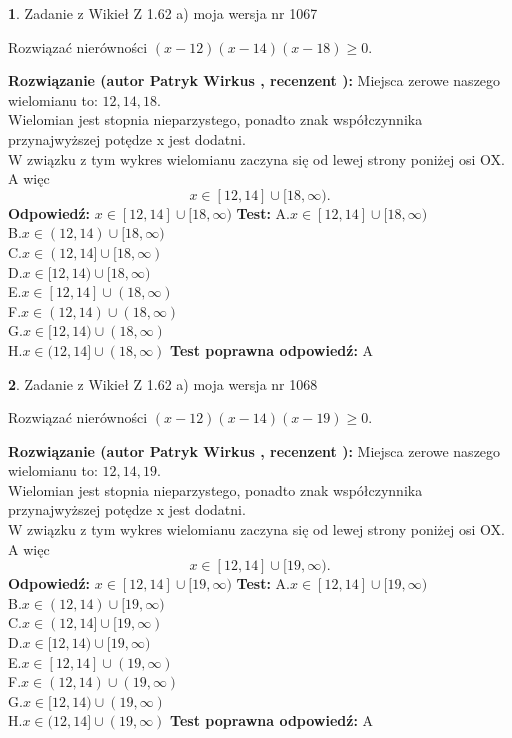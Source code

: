 \documentclass[12pt, a4paper]{article}
\theoremstyle{definition} %
\newtheorem{zad}{}
\newcommand{\zadStart}[1]{\begin{zad}#1\newline}
\newcommand{\zadStop}{\end{zad}}
\newcommand{\rozwStart}[2]{\noindent \textbf{Rozwiązanie (autor #1 , recenzent #2): }\newline}
\newcommand{\rozwStop}{\newline}
\newcommand{\odpStart}{\noindent \textbf{Odpowiedź:}\newline}
\newcommand{\odpStop}{\newline}
\newcommand{\testStart}{\noindent \textbf{Test:}\newline}
\newcommand{\testStop}{\newline}
\newcommand{\kluczStart}{\noindent \textbf{Test poprawna odpowiedź:}\newline}
\newcommand{\kluczStop}{\newline}
\begin{document}
\zadStart{Zadanie z Wikieł Z 1.62 a) moja wersja nr 1067}

Rozwiązać nierówności $(x-12)(x-14)(x-18)\ge0$.
\zadStop
\rozwStart{Patryk Wirkus}{}
Miejsca zerowe naszego wielomianu to: $12, 14, 18$.\\
Wielomian jest stopnia nieparzystego, ponadto znak współczynnika przy\linebreak najwyższej potędze x jest dodatni.\\ W związku z tym wykres wielomianu zaczyna się od lewej strony poniżej osi OX. A więc $$x \in [12,14] \cup [18,\infty).$$
\rozwStop
\odpStart
$x \in [12,14] \cup [18,\infty)$
\odpStop
\testStart
A.$x \in [12,14] \cup [18,\infty)$\\
B.$x \in (12,14) \cup [18,\infty)$\\
C.$x \in (12,14] \cup [18,\infty)$\\
D.$x \in [12,14) \cup [18,\infty)$\\
E.$x \in [12,14] \cup (18,\infty)$\\
F.$x \in (12,14) \cup (18,\infty)$\\
G.$x \in [12,14) \cup (18,\infty)$\\
H.$x \in (12,14] \cup (18,\infty)$
\testStop
\kluczStart
A
\kluczStop



\zadStart{Zadanie z Wikieł Z 1.62 a) moja wersja nr 1068}

Rozwiązać nierówności $(x-12)(x-14)(x-19)\ge0$.
\zadStop
\rozwStart{Patryk Wirkus}{}
Miejsca zerowe naszego wielomianu to: $12, 14, 19$.\\
Wielomian jest stopnia nieparzystego, ponadto znak współczynnika przy\linebreak najwyższej potędze x jest dodatni.\\ W związku z tym wykres wielomianu zaczyna się od lewej strony poniżej osi OX. A więc $$x \in [12,14] \cup [19,\infty).$$
\rozwStop
\odpStart
$x \in [12,14] \cup [19,\infty)$
\odpStop
\testStart
A.$x \in [12,14] \cup [19,\infty)$\\
B.$x \in (12,14) \cup [19,\infty)$\\
C.$x \in (12,14] \cup [19,\infty)$\\
D.$x \in [12,14) \cup [19,\infty)$\\
E.$x \in [12,14] \cup (19,\infty)$\\
F.$x \in (12,14) \cup (19,\infty)$\\
G.$x \in [12,14) \cup (19,\infty)$\\
H.$x \in (12,14] \cup (19,\infty)$
\testStop
\kluczStart
A
\kluczStop
\end{document}
